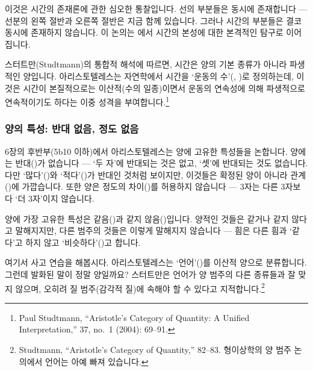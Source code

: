 \documentclass[12pt, a4paper]{article}
\begin{document}
이것은 시간의 존재론에 관한 심오한 통찰입니다. 선의 부분들은 동시에 존재합니다 --- 선분의 왼쪽 절반과 오른쪽 절반은 지금 함께 있습니다. 그러나 시간의 부분들은 결코 동시에 존재하지 않습니다. 이 논의는 에서 시간의 본성에 대한 본격적인 탐구로 이어집니다.

스터트만(Studtmann)의 통합적 해석에 따르면, 시간은 양의 기본 종류가 아니라 파생적인 양입니다. 아리스토텔레스는 자연학에서 시간을 `운동의 수'(, )로 정의하는데, 이것은 시간이 본질적으로는 이산적(수의 일종)이면서 운동의 연속성에 의해 파생적으로 연속적이기도 하다는 이중 성격을 부여합니다.\footnote{Paul Studtmann, ``Aristotle's Category of Quantity: A Unified Interpretation,''  37, no.\ 1 (2004): 69--91.}

\subsubsection{양의 특성: 반대 없음, 정도 없음}

6장의 후반부(5b10 이하)에서 아리스토텔레스는 양에 고유한 특성들을 논합니다. 양에는 반대()가 없습니다 --- `두 자'에 반대되는 것은 없고, `셋'에 반대되는 것도 없습니다. 다만 `많다'()와 `적다'()가 반대인 것처럼 보이지만, 이것들은 확정된 양이 아니라 관계()에 가깝습니다. 또한 양은 정도의 차이()를 허용하지 않습니다 --- 3자는 다른 3자보다 `더 3자'이지 않습니다.

양에 가장 고유한 특성은 같음()과 같지 않음()입니다. 양적인 것들은 같거나 같지 않다고 말해지지만, 다른 범주의 것들은 이렇게 말해지지 않습니다 --- 흼은 다른 흼과 `같다'고 하지 않고 `비슷하다'()고 합니다.

여기서 사고 연습을 해봅시다. 아리스토텔레스는 `언어'()를 이산적 양으로 분류합니다. 그런데 발화된 말이 정말 양일까요? 스터트만은 언어가 양 범주의 다른 종류들과 잘 맞지 않으며, 오히려 질 범주(감각적 질)에 속해야 할 수 있다고 지적합니다.\footnote{Studtmann, ``Aristotle's Category of Quantity,'' 82--83. 형이상학의 양 범주 논의에서 언어는 아예 빠져 있습니다.}

\end{document}
